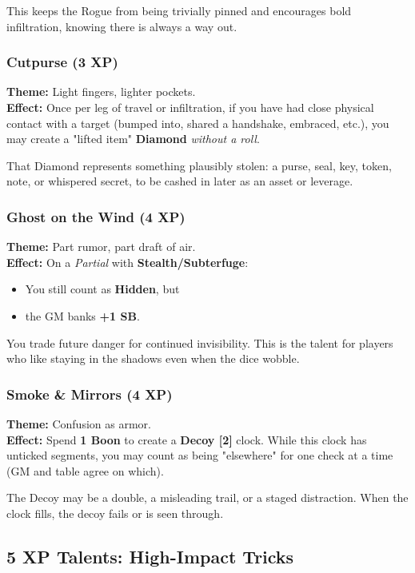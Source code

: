 \documentclass[11pt]{book}
\begin{document}
This keeps the Rogue from being trivially pinned and
encourages bold infiltration, knowing there is always a way out.

\subsubsection{Cutpurse (3 XP)}
\textbf{Theme:} Light fingers, lighter pockets.\\
\textbf{Effect:} Once per leg of travel or infiltration,
if you have had close physical contact with a target (bumped into,
shared a handshake, embraced, etc.), you may create a "lifted item"
\textbf{Diamond} \emph{without a roll}.

That Diamond represents something plausibly stolen: a purse, seal, key,
token, note, or whispered secret, to be cashed in later as an asset or leverage.

\subsubsection{Ghost on the Wind (4 XP)}
\textbf{Theme:} Part rumor, part draft of air.\\
\textbf{Effect:} On a \emph{Partial} with \textbf{Stealth/Subterfuge}:
\begin{itemize}
  \item You still count as \textbf{Hidden}, but
  \item the GM banks \textbf{+1 SB}.
\end{itemize}

You trade future danger for continued invisibility.  
This is the talent for players who like staying in the shadows
even when the dice wobble.

\subsubsection{Smoke \& Mirrors (4 XP)}
\textbf{Theme:} Confusion as armor.\\
\textbf{Effect:} Spend \textbf{1 Boon} to create a \textbf{Decoy [2]} clock.
While this clock has unticked segments, you may count as being
"elsewhere" for one check at a time (GM and table agree on which).

The Decoy may be a double, a misleading trail, or a staged distraction.
When the clock fills, the decoy fails or is seen through.

\subsection{5 XP Talents: High-Impact Tricks}
\end{document}
